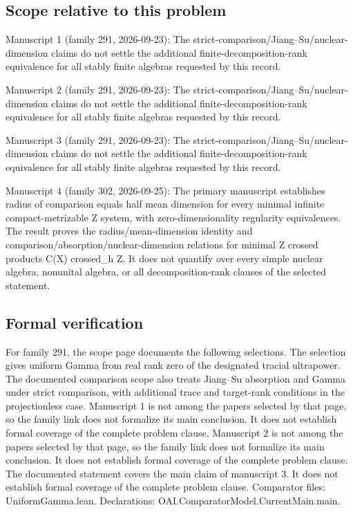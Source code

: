 \documentclass[11pt]{article}
\begin{document}
\subsection{Scope relative to this problem}
Manuscript 1 (family 291, 2026-09-23): The strict-comparison/Jiang–Su/nuclear-dimension claims do not settle the additional finite-decomposition-rank equivalence for all stably finite algebras requested by this record.

Manuscript 2 (family 291, 2026-09-23): The strict-comparison/Jiang–Su/nuclear-dimension claims do not settle the additional finite-decomposition-rank equivalence for all stably finite algebras requested by this record.

Manuscript 3 (family 291, 2026-09-23): The strict-comparison/Jiang–Su/nuclear-dimension claims do not settle the additional finite-decomposition-rank equivalence for all stably finite algebras requested by this record.

Manuscript 4 (family 302, 2026-09-25): The primary manuscript establishes radius of comparison equals half mean dimension for every minimal infinite compact-metrizable Z system, with zero-dimensionality regularity equivalences. The result proves the radius/mean-dimension identity and comparison/absorption/nuclear-dimension relations for minimal Z crossed products C(X) crossed\_h Z. It does not quantify over every simple nuclear algebra, nonunital algebra, or all decomposition-rank clauses of the selected statement.

\subsection{Formal verification}
For family 291, the scope page documents the following selections. The selection gives uniform Gamma from real rank zero of the designated tracial ultrapower. The documented comparison scope also treats Jiang--Su absorption and Gamma under strict comparison, with additional trace and target-rank conditions in the projectionless case. Manuscript 1 is not among the papers selected by that page, so the family link does not formalize its main conclusion. It does not establish formal coverage of the complete problem clause. Manuscript 2 is not among the papers selected by that page, so the family link does not formalize its main conclusion. It does not establish formal coverage of the complete problem clause. The documented statement covers the main claim of manuscript 3. It does not establish formal coverage of the complete problem clause. Comparator files: UniformGamma.lean. Declarations: OAI.ComparatorModel.CurrentMain.main.
\end{document}

